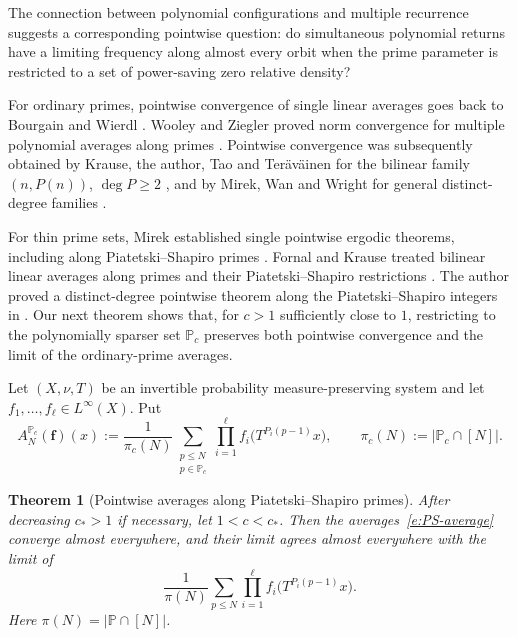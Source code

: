 \documentclass[12pt]{amsart}
\newcommand{\1}{\mathbf 1}
\newtheorem{theorem}{Theorem}[section]
\begin{document}
The connection between polynomial configurations and multiple recurrence
suggests a corresponding pointwise question: do simultaneous polynomial
returns have a limiting frequency along almost every orbit when the
prime parameter is restricted to a set of power-saving zero relative
density?

For ordinary primes, pointwise convergence of single linear averages
goes back to Bourgain and Wierdl \cite{BourgainPrimes,WierdlPrimes}.
Wooley and Ziegler proved norm convergence for multiple polynomial
averages along primes \cite{WooleyZiegler}. Pointwise convergence was
subsequently obtained by Krause, the author, Tao and Ter\"av\"ainen for
the bilinear family $(n,P(n))$, $\deg P\geq2$
\cite{KMTTPointwise}, and by Mirek, Wan and Wright for general
distinct-degree families \cite{MirekWanWright}.

For thin prime sets, Mirek established single pointwise ergodic
theorems, including along Piatetski--Shapiro primes
\cite{MirekThinPrimes}. Fornal and Krause treated bilinear linear
averages along primes and their Piatetski--Shapiro restrictions
\cite{FornalKrause}. The author proved a distinct-degree pointwise
theorem along the Piatetski--Shapiro integers in
\cite[Theorem~1.2]{mousavisolo}. Our next theorem shows that, for
$c>1$ sufficiently close to $1$, restricting to the polynomially
sparser set $\mathbb P_c$ preserves both pointwise convergence
and the limit of the ordinary-prime averages.  

 Let $(X,\nu,T)$ be an invertible
probability measure-preserving system and let
$f_1,\ldots,f_\ell\in L^\infty(X)$.  Put
\begin{equation}\label{e:PS-average}
 A_N^{\mathbb P_c}(\mathbf f)(x)
 :=\frac1{\pi_c(N)}
 \sum_{\substack{p\leq N\\p\in\mathbb P_c}}
 \prod_{i=1}^{\ell}f_i\bigl(T^{P_i(p-1)}x\bigr),
 \qquad \pi_c(N):=|\mathbb P_c\cap[N]|.
\end{equation}

\begin{theorem}[Pointwise averages along Piatetski--Shapiro primes]
\label{t:pointwise}
After decreasing $c_*>1$ if necessary, let $1<c<c_*$.  Then the
averages~\eqref{e:PS-average} converge almost everywhere, and their limit
agrees almost everywhere with the limit of
\begin{equation}\label{e:prime-average}
 \frac1{\pi(N)}\sum_{p\leq N}
 \prod_{i=1}^{\ell}f_i\bigl(T^{P_i(p-1)}x\bigr).
\end{equation}
Here $\pi(N)=|\mathbb P\cap[N]|$.
\end{theorem}
\end{document}
